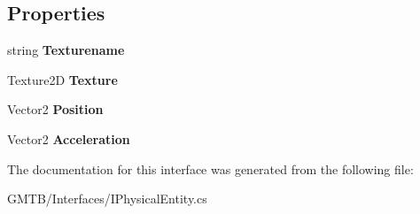 \subsection*{Properties}
\begin{DoxyCompactItemize}
\item 
\mbox{\label{interface_g_m_t_b_1_1_interfaces_1_1_i_physical_entity_a415d31888aab9114ff3096520a35ca99}} 
string {\bfseries Texturename}
\item 
\mbox{\label{interface_g_m_t_b_1_1_interfaces_1_1_i_physical_entity_a159f43adcc5593a16f0ae137a426e2f2}} 
Texture2D {\bfseries Texture}
\item 
\mbox{\label{interface_g_m_t_b_1_1_interfaces_1_1_i_physical_entity_a21e57fb308dd3af3f71b5757a79a08d7}} 
Vector2 {\bfseries Position}
\item 
\mbox{\label{interface_g_m_t_b_1_1_interfaces_1_1_i_physical_entity_a6c8cd2099e9c4c3aa67147822e6bcaab}} 
Vector2 {\bfseries Acceleration}
\end{DoxyCompactItemize}


The documentation for this interface was generated from the following file\+:\begin{DoxyCompactItemize}
\item 
G\+M\+T\+B/\+Interfaces/I\+Physical\+Entity.\+cs\end{DoxyCompactItemize}
